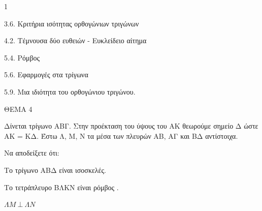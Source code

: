 \begin{ylh}{1}
    \item 3.6. Κριτήρια ισότητας ορθογώνιων τριγώνων
    \item 4.2. Τέμνουσα δύο ευθειών - Ευκλείδειο αίτημα
    \item 5.4. Ρόμβος
    \item 5.6. Εφαρμογές στα τρίγωνα
    \item 5.9. Μια ιδιότητα του ορθογώνιου τριγώνου.
\end{ylh}

ΘΕΜΑ 4

Δίνεται τρίγωνο ΑΒΓ. Στην προέκταση του ύψους του ΑΚ θεωρούμε σημείο Δ ώστε ΑΚ = ΚΔ. Έστω Λ, Μ, Ν τα μέσα των πλευρών ΑΒ, ΑΓ και ΒΔ αντίστοιχα.

Να αποδείξετε ότι:

\begin{alist}
\item Το τρίγωνο ΑΒΔ είναι ισοσκελές. 

\item Το τετράπλευρο ΒΛΚΝ είναι ρόμβος . 

\item $\Lambda Μ\ \bot\ \Lambda Ν$ 


\end{alist}
